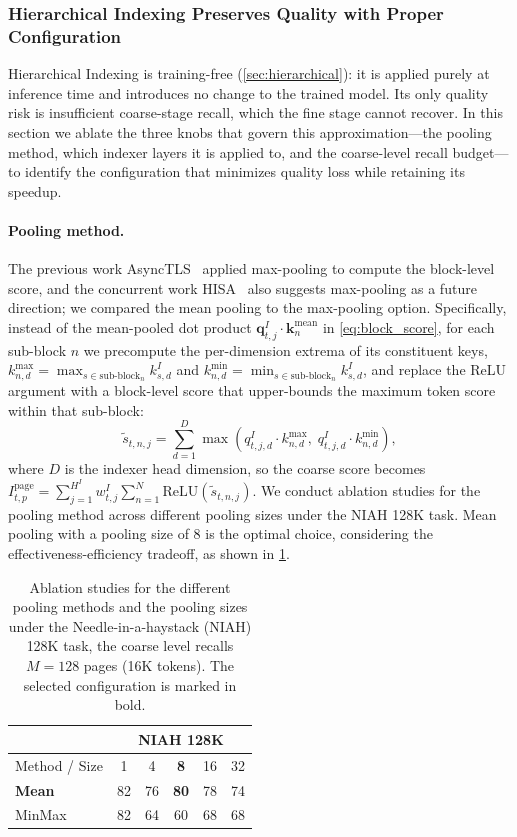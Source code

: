 \documentclass{article}
\newcommand{\mean}{\text{mean}}
\begin{document}
\subsubsection{Hierarchical Indexing Preserves Quality with Proper Configuration}
\label{sec:abl_hier}
Hierarchical Indexing is training-free (\cref{sec:hierarchical}): it is applied purely at inference time and introduces no change to the trained model. Its only quality risk is insufficient coarse-stage recall, which the fine stage cannot recover. In this section we ablate the three knobs that govern this approximation---the pooling method, which indexer layers it is applied to, and the coarse-level recall budget---to identify the configuration that minimizes quality loss while retaining its speedup.
\paragraph{Pooling method.}
The previous work AsyncTLS~\citep{hu2026asynctls} applied max-pooling to compute the block-level score, and the concurrent work HISA~\citep{xu2026hisa} also suggests max-pooling as a future direction; we compared the mean pooling to the max-pooling option. Specifically, instead of the mean-pooled dot product $\mathbf{q}_{t,j}^I \cdot \mathbf{k}_{n}^{\mean}$ in \cref{eq:block_score}, for each sub-block $n$ we precompute the per-dimension extrema of its constituent keys, $k_{n,d}^{\max} = \max_{s \in \text{sub-block}_n} k_{s,d}^I$ and $k_{n,d}^{\min} = \min_{s \in \text{sub-block}_n} k_{s,d}^I$, and replace the ReLU argument with a block-level score that upper-bounds the maximum token score within that sub-block:
\begin{equation}
\label{eq:sub-block_score_minmax}
\tilde{s}_{t,n,j} = \sum_{d=1}^{D}\max\!\left(q_{t,j,d}^I \cdot k_{n,d}^{\max},\; q_{t,j,d}^I \cdot k_{n,d}^{\min}\right),
\end{equation}
where $D$ is the indexer head dimension, so the coarse score becomes $I_{t,p}^{\text{page}} = \sum_{j=1}^{H^I} w_{t,j}^I \sum_{n=1}^{N} \mathrm{ReLU}(\tilde{s}_{t,n,j})$.
We conduct ablation studies for the pooling method across different pooling sizes under the NIAH 128K task. Mean pooling with a pooling size of 8 is the optimal choice, considering the effectiveness-efficiency tradeoff, as shown in \cref{tab:HI_ablations_pooling}.

\begin{table}[!h]
\centering
\small
\caption{Ablation studies for the different pooling methods and the pooling sizes under the Needle-in-a-haystack (NIAH) 128K task, the coarse level recalls $M=128$ pages (16K tokens). The selected configuration is marked in bold.}
\label{tab:HI_ablations_pooling}
\begin{tabular}{l|ccccc}
\toprule
& \multicolumn{5}{c}{\textbf{NIAH 128K}} \\
\midrule
Method / Size & 1 & 4 & \textbf{8} & 16 & 32 \\
\midrule
\textbf{Mean} & 82 & 76 & \textbf{80} & 78 & 74 \\
MinMax &82 & 64 & 60 & 68 & 68 \\
\bottomrule
\end{tabular}
\end{table}
\end{document}
